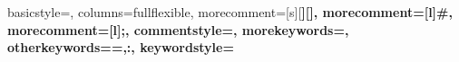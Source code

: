 \newcommand{\bottomlinec}{\arrayrulecolor{tablerowcolor}\specialrule{\aboverulesep}{0pt}{0pt}%
            \arrayrulecolor{black}\specialrule{\heavyrulewidth}{0pt}{\belowbottomsep}}%
\newcommand{\rowmidlineHR}{\arrayrulecolor{tableheadcolor}
  \specialrule{\aboverulesep}{0pt}{0pt}%
  \arrayrulecolor{black}\specialrule{\lightrulewidth}{0pt}{0pt}%
  \arrayrulecolor{tablerowcolor}\specialrule{\belowrulesep}{0pt}{0pt}%
  \arrayrulecolor{black}}
\newcommand{\rowmidlineG}{\arrayrulecolor{tablerowcolor}%
  \specialrule{\aboverulesep}{0pt}{0pt}%
  \arrayrulecolor{blcolor}\specialrule{\lightrulewidth}{0pt}{0pt}%
  \arrayrulecolor{tablerowcolor}\specialrule{\belowrulesep}{0pt}{0pt}%
  \arrayrulecolor{black}}
\renewcommand{\arraystretch}{1.3}
{
	basicstyle=\ttfamily\small,
	columns=fullflexible,
	morecomment=[s][\color{Orchid}\bfseries]{[}{]},
	morecomment=[l]{\#},
	morecomment=[l]{;},
	commentstyle=\color{gray}\ttfamily,
	morekeywords={},
	otherkeywords={=,:},
	keywordstyle={\color{green}\bfseries}
}


